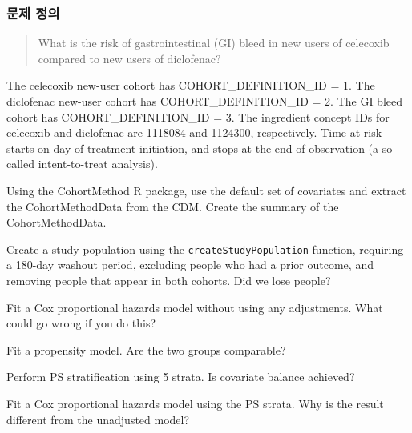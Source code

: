 \documentclass[11pt]{book}
\theoremstyle{definition}
\theoremstyle{definition}
\theoremstyle{definition}
\theoremstyle{remark}
\let\BeginKnitrBlock\begin \let\EndKnitrBlock\end
\begin{document}
\subsubsection*{문제 정의}\label{--2}

\begin{quote}
What is the risk of gastrointestinal (GI) bleed in new users of
celecoxib compared to new users of diclofenac?
\end{quote}

The celecoxib new-user cohort has COHORT\_DEFINITION\_ID = 1. The
diclofenac new-user cohort has COHORT\_DEFINITION\_ID = 2. The GI bleed
cohort has COHORT\_DEFINITION\_ID = 3. The ingredient concept IDs for
celecoxib and diclofenac are 1118084 and 1124300, respectively.
Time-at-risk starts on day of treatment initiation, and stops at the end
of observation (a so-called intent-to-treat analysis).

\BeginKnitrBlock{exercise}
\protect\hypertarget{exr:exercisePle1}{}{\label{exr:exercisePle1} }Using the
CohortMethod R package, use the default set of covariates and extract
the CohortMethodData from the CDM. Create the summary of the
CohortMethodData.
\EndKnitrBlock{exercise}

\BeginKnitrBlock{exercise}
\protect\hypertarget{exr:exercisePle2}{}{\label{exr:exercisePle2} }Create a
study population using the \texttt{createStudyPopulation} function,
requiring a 180-day washout period, excluding people who had a prior
outcome, and removing people that appear in both cohorts. Did we lose
people?
\EndKnitrBlock{exercise}

\BeginKnitrBlock{exercise}
\protect\hypertarget{exr:exercisePle3}{}{\label{exr:exercisePle3} }Fit a Cox
proportional hazards model without using any adjustments. What could go
wrong if you do this?
\EndKnitrBlock{exercise}

\BeginKnitrBlock{exercise}
\protect\hypertarget{exr:exercisePle4}{}{\label{exr:exercisePle4} }Fit a
propensity model. Are the two groups comparable?
\EndKnitrBlock{exercise}

\BeginKnitrBlock{exercise}
\protect\hypertarget{exr:exercisePle5}{}{\label{exr:exercisePle5} }Perform
PS stratification using 5 strata. Is covariate balance achieved?
\EndKnitrBlock{exercise}

\BeginKnitrBlock{exercise}
\protect\hypertarget{exr:exercisePle6}{}{\label{exr:exercisePle6} }Fit a Cox
proportional hazards model using the PS strata. Why is the result
different from the unadjusted model?
\EndKnitrBlock{exercise}
\end{document}
